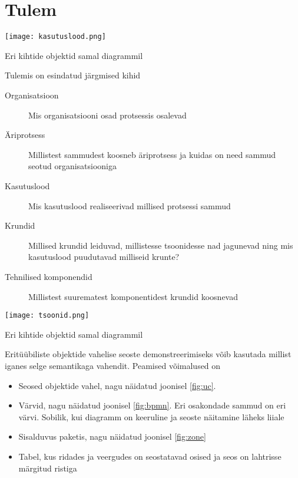 \documentclass[nobib]{tufte-handout}
\begin{document}
\section{Tulem}
\begin{marginfigure}%
  \texttt{[image: kasutuslood.png]}
  \caption{Eri kihtide objektid samal diagrammil}
  \label{fig:uc}
\end{marginfigure}

Tulemis on esindatud järgmised kihid
\begin{description}
	\item[Organisatsioon] Mis organisatsiooni osad protsessis osalevad
	\item[Äriprotsess] Millistest sammudest koosneb äriprotsess ja kuidas on need sammud seotud organisatsiooniga
	\item[Kasutuslood] Mis kasutuslood realiseerivad millised protsessi sammud
	\item[Krundid] Millised krundid leiduvad, millistesse tsoonidesse nad jagunevad ning mis kasutuslood puudutavad milliseid krunte?
	\item[Tehnilised komponendid] Millistest suurematest komponentidest krundid koosnevad
\end{description}
\begin{marginfigure}%
  \texttt{[image: tsoonid.png]}
  \caption{Eri kihtide objektid samal diagrammil}
  \label{fig:zone}
\end{marginfigure}

Eritüübiliste objektide vahelise seoste demonstreerimiseks võib kasutada millist iganes selge semantikaga vahendit. Peamised võimalused on
\begin{itemize}
	\item Seosed objektide vahel, nagu näidatud joonisel \ref{fig:uc}. 
	\item Värvid, nagu näidatud joonisel \ref{fig:bpmn}. Eri osakondade sammud on eri värvi. Sobilik, kui diagramm on keeruline ja seoste näitamine läheks liiale
	\item Sisalduvus paketis, nagu näidatud joonisel \ref{fig:zone}
	\item Tabel, kus ridades ja veergudes on seostatavad osised ja seos on lahtrisse märgitud ristiga
\end{itemize}
\end{document}
